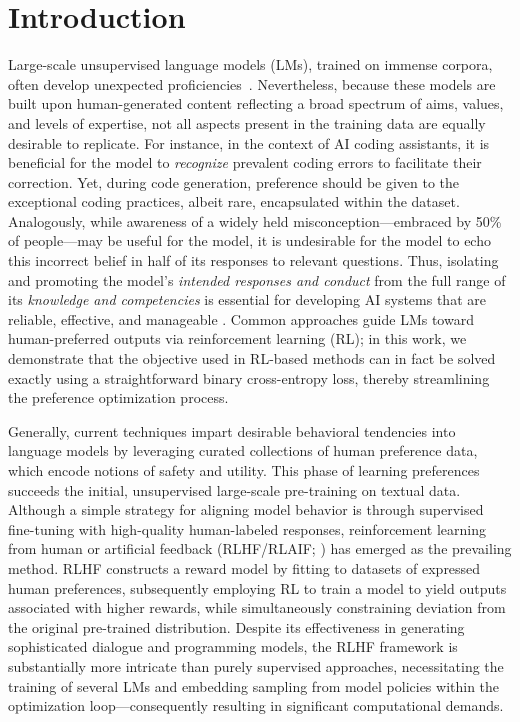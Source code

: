 \section{Introduction}
Large-scale unsupervised language models (LMs), trained on immense corpora, often develop unexpected proficiencies~\citep{chowdhery2022palm, brown2020language, touvron2023llama,bubeck2023sparks}. Nevertheless, because these models are built upon human-generated content reflecting a broad spectrum of aims, values, and levels of expertise, not all aspects present in the training data are equally desirable to replicate. For instance, in the context of AI coding assistants, it is beneficial for the model to \textit{recognize} prevalent coding errors to facilitate their correction. Yet, during code generation, preference should be given to the exceptional coding practices, albeit rare, encapsulated within the dataset. Analogously, while awareness of a widely held misconception—embraced by 50\% of people—may be useful for the model, it is undesirable for the model to echo this incorrect belief in half of its responses to relevant questions. Thus, isolating and promoting the model’s \emph{intended responses and conduct} from the full range of its \textit{knowledge and competencies} is essential for developing AI systems that are reliable, effective, and manageable \citep{ouyang2022training}. Common approaches guide LMs toward human-preferred outputs via reinforcement learning (RL); in this work, we demonstrate that the objective used in RL-based methods can in fact be solved exactly using a straightforward binary cross-entropy loss, thereby streamlining the preference optimization process.

Generally, current techniques impart desirable behavioral tendencies into language models by leveraging curated collections of human preference data, which encode notions of safety and utility. This phase of learning preferences succeeds the initial, unsupervised large-scale pre-training on textual data. Although a simple strategy for aligning model behavior is through supervised fine-tuning with high-quality human-labeled responses, reinforcement learning from human or artificial feedback (RLHF/RLAIF; \citep{christiano2017deep,bai2022constitutional}) has emerged as the prevailing method. RLHF constructs a reward model by fitting to datasets of expressed human preferences, subsequently employing RL to train a model to yield outputs associated with higher rewards, while simultaneously constraining deviation from the original pre-trained distribution. Despite its effectiveness in generating sophisticated dialogue and programming models, the RLHF framework is substantially more intricate than purely supervised approaches, necessitating the training of several LMs and embedding sampling from model policies within the optimization loop—consequently resulting in significant computational demands.

